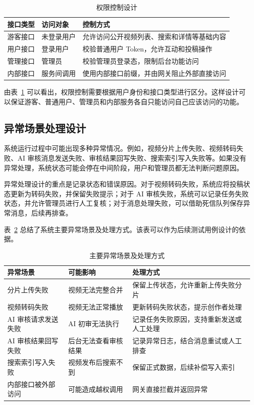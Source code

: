 \begin{table}[htbp]
  \centering
  \caption{权限控制设计}
  \label{tab:permission-design}
  \begin{tabular}{p{}p{}p{}}
    \hline
    \textbf{接口类型} & \textbf{访问对象} & \textbf{控制方式} \\
    \hline
    游客接口 & 未登录用户 & 允许访问公开视频列表、搜索和详情等基础内容 \\
    用户接口 & 登录用户 & 校验普通用户 Token，允许互动和投稿操作 \\
    管理接口 & 管理员 & 校验管理员登录态，限制后台功能访问 \\
    内部接口 & 服务间调用 & 使用内部接口前缀，并由网关阻止外部直接访问 \\
    \hline
  \end{tabular}
\end{table}

由表~\ref{tab:permission-design} 可以看出，权限控制需要根据用户身份和接口类型进行区分。这样设计可以保证游客、普通用户、管理员和内部服务各自只能访问自己应该访问的功能。

\subsection{异常场景处理设计}
\label{subsec:exception-scene-design}

系统运行过程中可能出现多种异常情况。例如，视频分片上传失败、视频转码失败、AI 审核消息发送失败、审核结果回写失败、搜索索引写入失败等。如果没有异常处理，系统状态可能会停在中间阶段，用户和管理员都无法判断问题原因。

异常处理设计的重点是记录状态和错误原因。对于视频转码失败，系统应将投稿状态更新为转码失败，并保留失败提示；对于 AI 审核失败，系统可以记录任务失败状态，并允许管理员进行人工复核；对于消息处理失败，可以借助死信队列保存异常消息，后续再排查。

表~\ref{tab:exception-design} 总结了系统主要异常场景及处理方式。该表可以作为后续测试用例设计的依据。

\begin{table}[htbp]
  \centering
  \caption{主要异常场景及处理方式}
  \label{tab:exception-design}
  \begin{tabular}{p{}p{}p{}}
    \hline
    \textbf{异常场景} & \textbf{可能影响} & \textbf{处理方式} \\
    \hline
    分片上传失败 & 视频无法完整合并 & 保留上传状态，允许重新上传失败分片 \\
    视频转码失败 & 视频无法正常播放 & 更新转码失败状态，提示创作者处理 \\
    AI 审核请求发送失败 & AI 初审无法执行 & 记录任务失败原因，支持重新发送或人工处理 \\
    AI 审核结果回写失败 & 后台无法查看审核结果 & 记录异常日志，结合消息重试或人工排查 \\
    搜索索引写入失败 & 视频发布后搜索不到 & 保留正式数据，后续补偿写入索引 \\
    内部接口被外部访问 & 可能造成越权调用 & 网关直接拦截并返回异常 \\
    \hline
  \end{tabular}
\end{table}

